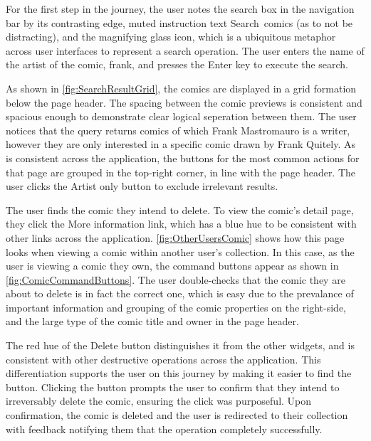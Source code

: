 \documentclass[fontsize=12pt,a4paper]{scrreprt}
\begin{document}
For the first step in the journey, the user notes the search box in the navigation bar by its contrasting edge, muted instruction text \textsf{Search~comics} (as to not be distracting), and the magnifying glass icon, which is a ubiquitous metaphor across user interfaces to represent a search operation. The user enters the name of the artist of the comic, \textsf{frank}, and presses the \textsf{Enter} key to execute the search.

As shown in \autoref{fig:SearchResultGrid}, the comics are displayed in a grid formation below the page header. The spacing between the comic previews is consistent and spacious enough to demonstrate clear logical seperation between them. The user notices that the query returns comics of which \textsf{Frank Mastromauro} is a writer, however they are only interested in a specific comic drawn by \textsf{Frank Quitely}. As is consistent across the application, the buttons for the most common actions for that page are grouped in the top-right corner, in line with the page header. The user clicks the \textsf{Artist only} button to exclude irrelevant results.

The user finds the comic they intend to delete. To view the comic's detail page, they click the \textsf{More information} link, which has a blue hue to be consistent with other links across the application. \autoref{fig:OtherUsersComic} shows how this page looks when viewing a comic within another user's collection. In this case, as the user is viewing a comic they own, the command buttons appear as shown in \autoref{fig:ComicCommandButtons}. The user double-checks that the comic they are about to delete is in fact the correct one, which is easy due to the prevalance of important information and grouping of the comic properties on the right-side, and the large type of the comic title and owner in the page header.

The red hue of the \textsf{Delete} button distinguishes it from the other widgets, and is consistent with other destructive operations across the application. This differentiation supports the user on this journey by making it easier to find the button. Clicking the button prompts the user to confirm that they intend to irreversably delete the comic, ensuring the click was purposeful. Upon confirmation, the comic is deleted and the user is redirected to their collection with feedback notifying them that the operation completely successfully.
\end{document}
